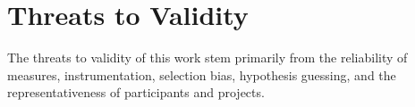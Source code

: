 \documentclass{sig-alternate}
\begin{document}
\begin{abstract}
%

\end{abstract}













\section{Threats to Validity}
\label{sec:threats}
The threats to validity of this work stem primarily from the reliability of measures, instrumentation, selection bias, hypothesis guessing, and the representativeness of participants and projects.
\end{document}
